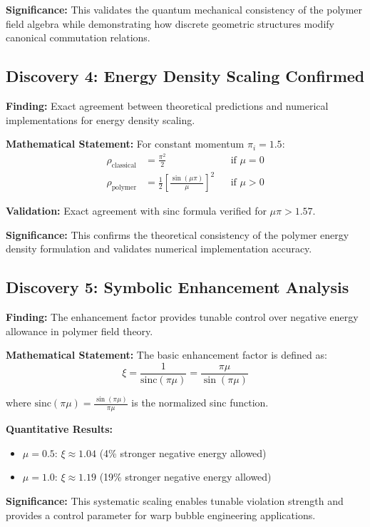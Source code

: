 \documentclass[11pt]{article}
\begin{document}
\textbf{Significance:} This validates the quantum mechanical consistency of the polymer field algebra while demonstrating how discrete geometric structures modify canonical commutation relations.

\subsection{Discovery 4: Energy Density Scaling Confirmed}

\textbf{Finding:} Exact agreement between theoretical predictions and numerical implementations for energy density scaling.

\textbf{Mathematical Statement:}
For constant momentum $\pi_i = 1.5$:
\begin{align}
\rho_{\text{classical}} &= \frac{\pi^2}{2} && \text{if } \mu = 0 \\
\rho_{\text{polymer}} &= \frac{1}{2}\left[\frac{\sin(\mu\pi)}{\mu}\right]^2 && \text{if } \mu > 0
\end{align}

\textbf{Validation:} Exact agreement with sinc formula verified for $\mu\pi > 1.57$.

\textbf{Significance:} This confirms the theoretical consistency of the polymer energy density formulation and validates numerical implementation accuracy.

\subsection{Discovery 5: Symbolic Enhancement Analysis}

\textbf{Finding:} The enhancement factor provides tunable control over negative energy allowance in polymer field theory.

\textbf{Mathematical Statement:}
The basic enhancement factor is defined as:
$$\xi = \frac{1}{\text{sinc}(\pi\mu)} = \frac{\pi\mu}{\sin(\pi\mu)}$$

where $\text{sinc}(\pi\mu) = \frac{\sin(\pi\mu)}{\pi\mu}$ is the normalized sinc function.

\textbf{Quantitative Results:}
\begin{itemize}
    \item $\mu = 0.5$: $\xi \approx 1.04$ (4\% stronger negative energy allowed)
    \item $\mu = 1.0$: $\xi \approx 1.19$ (19\% stronger negative energy allowed)
\end{itemize}

\textbf{Significance:} This systematic scaling enables tunable violation strength and provides a control parameter for warp bubble engineering applications.
\end{document}
